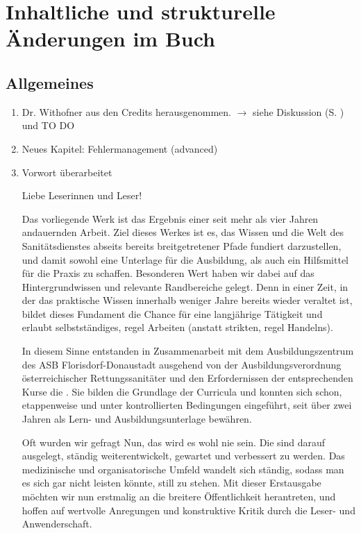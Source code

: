 \documentclass[
ngerman,
paper=a4,
asymmetric,
fontsize=10pt,
draft=false,
numbers=noenddot,
bibtotocnumbered,
footnotes=multiple,
]{scrreprt}
\newcommand{\jALT}{\vspace{6pt}\noindent{\color{red}\sffamily\textbf{DELETED}\hrulefill\newline}}
\begin{document}
\chapter{Inhaltliche und strukturelle Änderungen im Buch}

\section{Allgemeines}
\begin{enumerate}
  \item Dr. Withofner aus den Credits herausgenommen. $\to$ siehe Diskussion
  (S. \pageref{chp:review-diskussion}) und TO DO
  \item Neues Kapitel: Fehlermanagement (advanced)
  \item Vorwort überarbeitet
  
  \jALT
  \noindent Liebe Leserinnen und Leser!
  
  Das vorliegende Werk ist das Ergebnis einer seit
mehr als vier Jahren andauernden Arbeit. 
Ziel dieses Werkes ist es, das Wissen und die Welt des Sanitätsdienstes abseits
bereits breitgetretener Pfade fundiert darzustellen, und
damit sowohl eine Unterlage für die Ausbildung, als auch ein
Hilfsmittel für die Praxis zu schaffen.  
Besonderen Wert haben wir dabei 
auf das Hintergrundwissen und relevante Randbereiche gelegt.
Denn in einer Zeit, in der das praktische Wissen innerhalb weniger Jahre bereits
wieder veraltet ist, bildet dieses Fundament die Chance für eine
langjährige Tätigkeit und erlaubt selbstständiges, regel Arbeiten
(anstatt strikten, regel Handelns). 

In diesem Sinne entstanden in Zusammenarbeit mit dem Ausbildungszentrum des ASB
Florisdorf-Donaustadt ausgehend von der Ausbildungsverordnung 
österreichischer Rettungssanitäter und den Erfordernissen der entsprechenden
Kurse die {\AASS}. Sie bilden die Grundlage der Curricula und konnten sich
schon, etappenweise und unter kontrollierten Bedingungen eingeführt, seit über
zwei Jahren als Lern- und Ausbildungsunterlage
bewähren.

Oft wurden wir
gefragt  
Nun, das wird es wohl nie sein. Die {\AASS} sind darauf ausgelegt,
ständig weiterentwickelt, gewartet und verbessert zu werden. Das medizinische
und organisatorische Umfeld wandelt sich ständig, sodass man es sich gar nicht
leisten könnte, still zu stehen.
Mit dieser Erstausgabe möchten wir nun erstmalig an die
breitere Öffentlichkeit herantreten, und hoffen 
auf wertvolle Anregungen und konstruktive Kritik durch die
Leser- und Anwenderschaft.


\end{enumerate}
\end{document}

